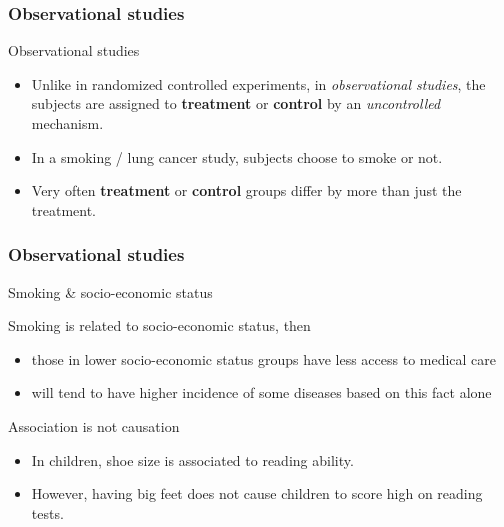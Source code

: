 \documentclass[handout]{beamer}
\begin{document}
   \begin{frame} \frametitle{Observational studies}

   \begin{block}
   {Observational studies}
   \begin{itemize}
   \item Unlike in randomized controlled experiments, in {\em observational studies}, the subjects are assigned to {\bf \color{red} treatment} or {\bf \color{blue} control} by an {\em uncontrolled} mechanism.
   \item In a smoking / lung cancer study, subjects choose to smoke or not.
   \item Very often {\bf \color{red} treatment} or {\bf \color{blue} control} groups differ by more than just the treatment.
   \end{itemize}
   \end{block}
   \end{frame}


   \begin{frame} \frametitle{Observational studies}

   \begin{block}
   {Smoking \& socio-economic status}

   Smoking is related to socio-economic status, then
     \begin{itemize}
     \item     those in lower socio-economic status groups have less access to medical care
     \item will tend to have higher incidence of some diseases based on this fact alone
     \end{itemize}
   \end{block}

   \begin{block}
   {Association is not causation}
   \begin{itemize}
   \item    In children, shoe size is associated to reading ability.

   \item However, having big feet does not cause children to score high on reading tests.
   \end{itemize}
   \end{block}
   \end{frame}

\end{document}
